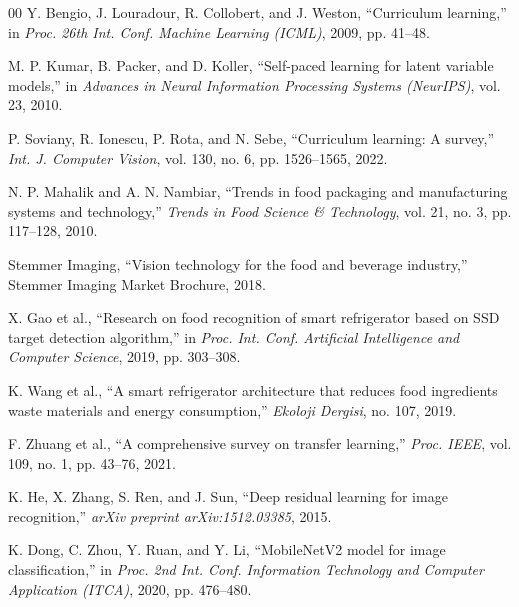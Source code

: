 \begin{thebibliography}{00}
Y. Bengio, J. Louradour, R. Collobert, and J. Weston, ``Curriculum learning,'' in \textit{Proc. 26th Int. Conf. Machine Learning (ICML)}, 2009, pp. 41--48.

M. P. Kumar, B. Packer, and D. Koller, ``Self-paced learning for latent variable models,'' in \textit{Advances in Neural Information Processing Systems (NeurIPS)}, vol. 23, 2010.

P. Soviany, R. Ionescu, P. Rota, and N. Sebe, ``Curriculum learning: A survey,'' \textit{Int. J. Computer Vision}, vol. 130, no. 6, pp. 1526--1565, 2022.


N. P. Mahalik and A. N. Nambiar, ``Trends in food packaging and manufacturing systems and technology,'' \textit{Trends in Food Science \& Technology}, vol. 21, no. 3, pp. 117--128, 2010.

Stemmer Imaging, ``Vision technology for the food and beverage industry,'' Stemmer Imaging Market Brochure, 2018.

X. Gao et al., ``Research on food recognition of smart refrigerator based on SSD target detection algorithm,'' in \textit{Proc. Int. Conf. Artificial Intelligence and Computer Science}, 2019, pp. 303--308.

K. Wang et al., ``A smart refrigerator architecture that reduces food ingredients waste materials and energy consumption,'' \textit{Ekoloji Dergisi}, no. 107, 2019.

F. Zhuang et al., ``A comprehensive survey on transfer learning,'' \textit{Proc. IEEE}, vol. 109, no. 1, pp. 43--76, 2021.

K. He, X. Zhang, S. Ren, and J. Sun, ``Deep residual learning for image recognition,'' \textit{arXiv preprint arXiv:1512.03385}, 2015.

K. Dong, C. Zhou, Y. Ruan, and Y. Li, ``MobileNetV2 model for image classification,'' in \textit{Proc. 2nd Int. Conf. Information Technology and Computer Application (ITCA)}, 2020, pp. 476--480.

\end{thebibliography}